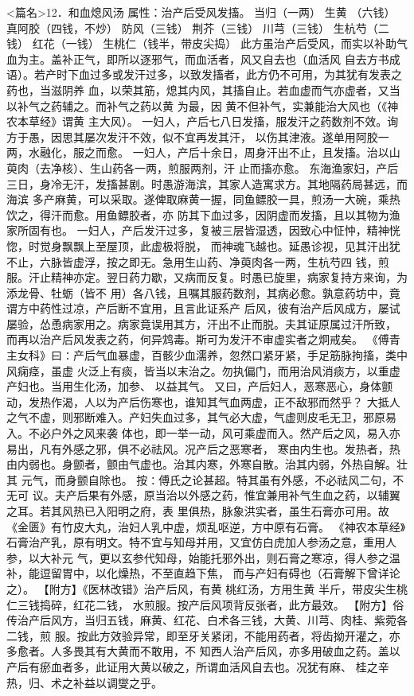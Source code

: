 \documentclass[a4paper,12pt,UTF8,twoside]{ctexbook}
\begin{document}
<篇名>12．和血熄风汤
属性：治产后受风发搐。 
当归（一两） 生黄 （六钱） 真阿胶（四钱，不炒） 防风（三钱） 荆芥（三钱） 川芎（三钱） 
生杭芍（二钱） 红花（一钱） 生桃仁（钱半，带皮尖捣） 
此方虽治产后受风，而实以补助气血为主。盖补正气，即所以逐邪气，而血活者，风又自去也（血活风 
自去方书成语）。若产时下血过多或发汗过多，以致发搐者，此方仍不可用，为其犹有发表之药也，当滋阴养 
血，以荣其筋，熄其内风，其搐自止。若血虚而气亦虚者，又当以补气之药辅之。而补气之药以黄 为最，因 
黄不但补气，实兼能治大风也（《神农本草经》谓黄 主大风）。 
一妇人，产后七八日发搐，服发汗之药数剂不效。询方于愚，因思其屡次发汗不效，似不宜再发其汗， 
以伤其津液。遂单用阿胶一两，水融化，服之而愈。 
一妇人，产后十余日，周身汗出不止，且发搐。治以山萸肉（去净核）、生山药各一两，煎服两剂，汗 
止而搐亦愈。 
东海渔家妇，产后三日，身冷无汗，发搐甚剧。时愚游海滨，其家人造寓求方。其地隔药局甚远，而海滨 
多产麻黄，可以采取。遂俾取麻黄一握，同鱼鳔胶一具，煎汤一大碗，乘热饮之，得汗而愈。用鱼鳔胶者，亦 
防其下血过多，因阴虚而发搐，且以其物为渔家所固有也。 
一妇人，产后发汗过多，复被三层皆湿透，因致心中怔忡，精神恍惚，时觉身飘飘上至屋顶，此虚极将脱， 
而神魂飞越也。延愚诊视，见其汗出犹不止，六脉皆虚浮，按之即无。急用生山药、净萸肉各一两，生杭芍四 
钱，煎服。汗止精神亦定。翌日药力歇，又病而反复。时愚已旋里，病家复持方来询，为添龙骨、牡蛎（皆不 
用）各八钱，且嘱其服药数剂，其病必愈。孰意药坊中，竟谓方中药性过凉，产后断不宜用，且言此证系产 
后风，彼有治产后风成方，屡试屡验，怂恿病家用之。病家竟误用其方，汗出不止而脱。夫其证原属过汗所致， 
而再以治产后风发表之药，何异鸩毒。斯可为发汗不审虚实者之炯戒矣。 
《傅青主女科》曰∶产后气血暴虚，百骸少血濡养，忽然口紧牙紧，手足筋脉拘搐，类中风痫痉，虽虚 
火泛上有痰，皆当以末治之。勿执偏门，而用治风消痰方，以重虚产妇也。当用生化汤，加参、 以益其气。 
又曰，产后妇人，恶寒恶心，身体颤动，发热作渴，人以为产后伤寒也，谁知其气血两虚，正不敌邪而然乎？ 
大抵人之气不虚，则邪断难入。产妇失血过多，其气必大虚，气虚则皮毛无卫，邪原易入。不必户外之风来袭 
体也，即一举一动，风可乘虚而入。然产后之风，易入亦易出，凡有外感之邪，俱不必祛风。况产后之恶寒者， 
寒由内生也。发热者，热由内弱也。身颤者，颤由气虚也。治其内寒，外寒自散。治其内弱，外热自解。壮其 
元气，而身颤自除也。 
按∶傅氏之论甚超。特其虽有外感，不必祛风二句，不无可 
议。夫产后果有外感，原当治以外感之药，惟宜兼用补气生血之药，以辅翼之耳。若其风热已入阳明之府，表 
里俱热，脉象洪实者，虽生石膏亦可用。故《金匮》有竹皮大丸，治妇人乳中虚，烦乱呕逆，方中原有石膏。 
《神农本草经》石膏治产乳，原有明文。特不宜与知母并用，又宜仿白虎加人参汤之意，重用人参，以大补元 
气，更以玄参代知母，始能托邪外出，则石膏之寒凉，得人参之温补，能逗留胃中，以化燥热，不至直趋下焦， 
而与产妇有碍也（石膏解下曾详论之）。 
【附方】《医林改错》治产后风，有黄 桃红汤，方用生黄 半斤，带皮尖生桃仁三钱捣碎，红花二钱， 
水煎服。按产后风项背反张者，此方最效。 
【附方】俗传治产后风方，当归五钱，麻黄、红花、白术各三钱，大黄、川芎、肉桂、紫菀各二钱，煎 
服。按此方效验异常，即至牙关紧闭，不能用药者，将齿拗开灌之，亦多愈者。人多畏其有大黄而不敢用，不 
知西人治产后风，亦多用破血之药。盖以产后有瘀血者多，此证用大黄以破之，所谓血活风自去也。况犹有麻、 
桂之辛热，归、术之补益以调燮之乎。 
\end{document}

